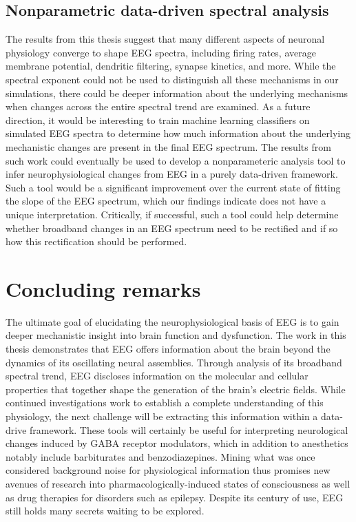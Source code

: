 \subsection{Nonparametric data-driven spectral analysis}
The results from this thesis suggest that many different aspects of neuronal physiology converge to shape EEG spectra, including firing rates, average membrane potential, dendritic filtering, synapse kinetics, and more. While the spectral exponent could not be used to distinguish all these mechanisms in our simulations, there could be deeper information about the underlying mechanisms when changes across the entire spectral trend are examined. As a future direction, it would be interesting to train machine learning classifiers on simulated EEG spectra to determine how much information about the underlying mechanistic changes are present in the final EEG spectrum. The results from such work could eventually be used to develop a nonparameteric analysis tool to infer neurophysiological changes from EEG in a purely data-driven framework. Such a tool would be a significant improvement over the current state of fitting the slope of the EEG spectrum, which our findings indicate does not have a unique interpretation. Critically, if successful, such a tool could help determine whether broadband changes in an EEG spectrum need to be rectified and if so how this rectification should be performed.

\section{Concluding remarks}
The ultimate goal of elucidating the neurophysiological basis of EEG is to gain deeper mechanistic insight into brain function and dysfunction. The work in this thesis demonstrates that EEG offers information about the brain beyond the dynamics of its oscillating neural assemblies. Through analysis of its broadband spectral trend, EEG discloses information on the molecular and cellular properties that together shape the generation of the brain's electric fields. While continued investigations work to establish a complete understanding of this physiology, the next challenge will be extracting this information within a data-drive framework. These tools will certainly be useful for interpreting neurological changes induced by GABA receptor modulators, which in addition to anesthetics notably include barbiturates and benzodiazepines. Mining what was once considered background noise for physiological information thus promises new avenues of research into pharmacologically-induced states of consciousness as well as drug therapies for disorders such as epilepsy. Despite its century of use, EEG still holds many secrets waiting to be explored.